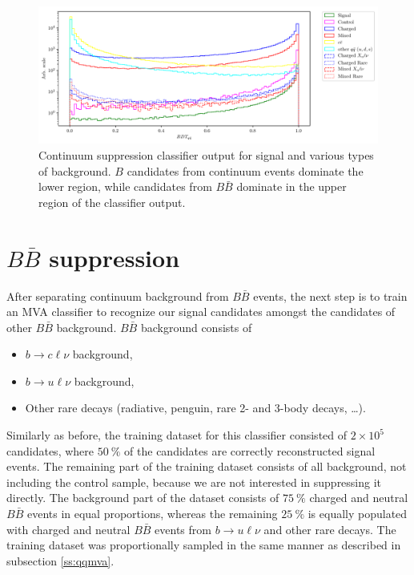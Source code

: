 \documentclass[  headings=standardclasses,
  headings=big,oneside,a4paper,openany,12pt]{scrbook}
\newcommand {\E}[1]{\times 10^{#1}}
\begin{document}
\begin{figure}[H]
\centering
\captionsetup{width=0.8\linewidth}
\includegraphics[width=\linewidth]{fig/cs_BDT}
\caption{Continuum suppression classifier output for signal and various types of background. $B$ candidates from continuum events dominate the lower region, while candidates from $B\bar B$ dominate in the upper region of the classifier output.}
\label{fig:cs_mva}
\end{figure}

\section{$B\bar B$ suppression}

After separating continuum background from $B \bar B$ events, the next step is to train an MVA classifier to recognize our signal candidates amongst the candidates of other $B \bar B$ background. $B \bar B$ background consists of
\begin{itemize}
\item $b \to c \ell \nu$ background,
\item $b \to u \ell \nu$ background,
\item Other rare decays (radiative, penguin, rare 2- and 3-body decays, \dots).
\end{itemize}

Similarly as before, the training dataset for this classifier consisted of $2\E5$ candidates, where $50~\%$ of the candidates are correctly reconstructed signal events. The remaining part of the training dataset consists of all background, not including the control sample, because we are not interested in suppressing it directly. The background part of the dataset consists of $75~\%$ charged and neutral $B \bar B$ events in equal proportions, whereas the remaining $25~\%$ is equally populated with charged and neutral $B \bar B$ events from $b \to u \ell \nu$ and other rare decays. The training dataset was proportionally sampled in the same manner as described in subsection \ref{ss:qqmva}.
\end{document}
